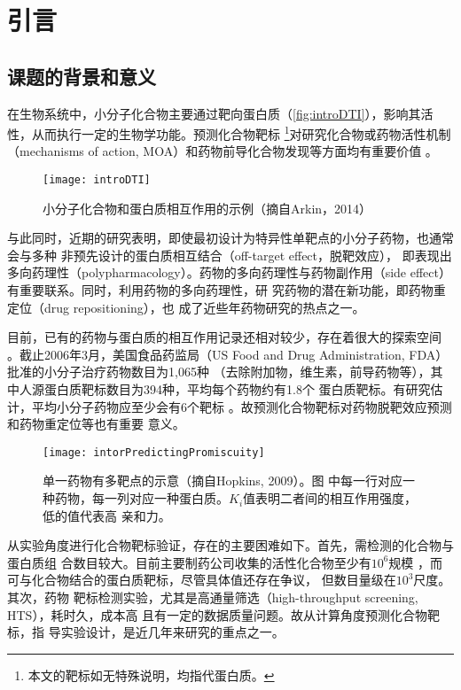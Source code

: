 \chapter{引言}
\label{cha:intro}
\section{课题的背景和意义}
在生物系统中，小分子化合物主要通过靶向蛋白质（\autoref{fig:introDTI}），影响其活
性，从而执行一定的生物学功能\cite{overington2006many}。预测化合物靶标%
\footnote{本文的靶标如无特殊说明，均指代蛋白质。}对研究化合物或药物活性机制
（mechanisms of action, MOA）和药物前导化合物发现等方面均有重要价值
\cite{backus2016proteome}。
\begin{figure}[H]
  \centering
  \texttt{[image: introDTI]}
  \caption{小分子化合物和蛋白质相互作用的示例（摘自Arkin，2014）\cite{arkin2014small}}
  \label{fig:introDTI}
\end{figure}

与此同时，近期的研究表明，即使最初设计为特异性单靶点的小分子药物，也通常会与多种
非预先设计的蛋白质相互结合\cite{hopkins2009drug}（off-target effect，脱靶效应），
即表现出多向药理性（polypharmacology）。药物的多向药理性与药物副作用（side
effect）有重要联系\cite{tatonetti2009predicting}。同时，利用药物的多向药理性，研
究药物的潜在新功能，即药物重定位\cite{ashburn2004drug}（drug repositioning），也
成了近些年药物研究的热点之一\cite{mei2012opportunities}。

目前，已有的药物与蛋白质的相互作用记录还相对较少，存在着很大的探索空间
\cite{keiser2009predicting}。截止2006年3月，美国食品药监局（US Food and Drug
Administration, FDA）批准的小分子治疗药物数目为1,065种
（去除附加物，维生素，前导药物等），其中人源蛋白质靶标数目为394种，平均每个药物约有1.8个
蛋白质靶标\cite{yildirim2007drug}。有研究估计，平均小分子药物应至少会有6个靶标
\cite{mestres2008data}。故预测化合物靶标对药物脱靶效应预测和药物重定位等也有重要
意义。
\begin{figure}[htbp]
  \centering
  \texttt{[image: intorPredictingPromiscuity]}
  \caption{单一药物有多靶点的示意（摘自Hopkins, 2009）\cite{hopkins2009drug}。图
    中每一行对应一种药物，每一列对应一种蛋白质。$K_i$值表明二者间的相互作用强度，低的值代表高
    亲和力。}
  \label{fig:introPolypharamacology}
\end{figure}

从实验角度进行化合物靶标验证，存在的主要困难如下。首先，需检测的化合物与蛋白质组
合数目较大。目前主要制药公司收集的活性化合物至少有$10^6$规模
\cite{schenone2013target}，而可与化合物结合的蛋白质靶标，尽管具体值还存在争议，
但数目量级在$10^3$尺度\cite{hopkins2002druggable,overington2006many}。其次，药物
靶标检测实验，尤其是高通量筛选（high-throughput screening, HTS），耗时久，成本高
且有一定的数据质量问题\cite{malo2006statistical}。故从计算角度预测化合物靶标，指
导实验设计，是近几年来研究的重点之一。

